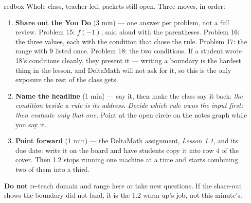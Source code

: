 \documentclass[10pt]{article}
\begin{document}
\boxguard[20]
\begin{skillbox}{redbox}
Whole class, teacher-led, packets still open. Three moves, in order:
\begin{enumerate}[itemsep=3pt]
  \item \textbf{Share out the You Do} (3 min) --- one answer per problem,
        not a full review. Problem 15: $f(-1)$, said aloud with the parentheses.
        Problem 16: the three values, each with the condition that chose the rule.
        Problem 17: the range with 9 listed once. Problem 18: the two conditions.
        If a student wrote 18's conditions cleanly, they present it --- writing a
        boundary is the hardest thing in the lesson, and DeltaMath will not ask
        for it, so this is the only exposure the rest of the class gets.
  \item \textbf{Name the headline} (1 min) --- say it, then make the class say it
        back: \textit{the condition beside a rule is its address. Decide which rule
        owns the input first; then evaluate only that one.} Point at the open
        circle on the notes graph while you say it.
  \item \textbf{Point forward} (1 min) --- the DeltaMath assignment,
        \textit{Lesson 1.1}, and its due date: write it on the board and have
        students copy it into row 4 of the cover. Then 1.2 stops running one
        machine at a time and starts combining two of them into a third.
\end{enumerate}
\textbf{Do not} re-teach domain and range here or take new questions. If the
share-out shows the boundary did not land, it is the 1.2 warm-up's job, not this
minute's.
\end{skillbox}
\end{document}
